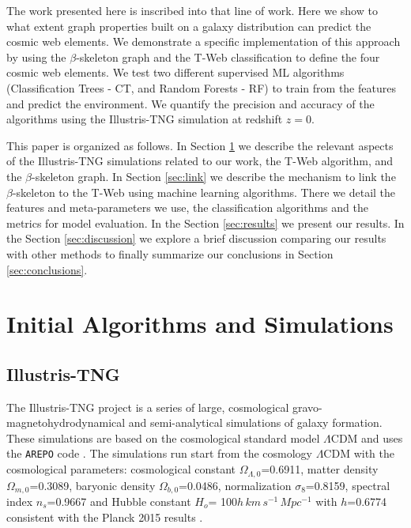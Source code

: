 \documentclass[usenatbib]{mnras}
\begin{document}
The work presented here is inscribed into that line of work.
Here we show to what extent graph properties built on a galaxy
distribution can predict the cosmic web elements.
We demonstrate a specific implementation of this approach by using
the $\beta$-skeleton graph \citep{Fang2019} and the T-Web
\citep{Forero-Romero2009} classification to define the four cosmic web elements.  
We test two different supervised ML
algorithms (Classification Trees - CT, and Random Forests - RF) 
to train from the features and predict the environment.
We quantify the precision and accuracy of the algorithms using the Illustris-TNG simulation \citep{Nelson2019} at redshift $z=0$.

This paper is organized as follows. 
In Section \ref{sec:init} we describe the relevant aspects of the Illustris-TNG
simulations related to our work, the T-Web algorithm,
and the $\beta$-skeleton graph.
In Section \ref{sec:link} we describe the mechanism to link the
$\beta$-skeleton to the T-Web using machine learning algorithms.
There we detail the features and meta-parameters we use, the
classification algorithms and the metrics for model evaluation.  
In the Section \ref{sec:results} we present our results. In the Section \ref{sec:discussion} we explore a brief discussion comparing our results with other methods 
to finally summarize our conclusions in Section
\ref{sec:conclusions}.

\section{Initial Algorithms and Simulations}\label{sec:init}

\subsection{Illustris-TNG}

The
Illustris-TNG project \citep{Nelson2019} is a series of large,
cosmological gravo-magnetohydrodynamical and semi-analytical simulations of galaxy formation. 
These simulations are based on the cosmological standard model
$\Lambda$CDM and uses the \texttt{AREPO} code \citep{Springel2011}.
The simulations run start from the cosmology $\Lambda$CDM with the
cosmological parameters: cosmological constant
$\Omega_{\Lambda,0}$=0.6911, matter density $\Omega_{m,0}$=0.3089,
baryonic density $\Omega_{b,0}$=0.0486, normalization
$\sigma_8$=0.8159, spectral index $n_s$=0.9667 and Hubble constant
$H_o$= 100$h\,km\,s^{-1}\,Mpc^{-1}$ with $h$=0.6774 consistent with
the Planck 2015 results \citep{Ade2016}.  
\end{document}
